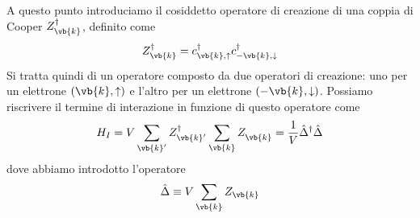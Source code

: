 A questo punto introduciamo il cosiddetto operatore di creazione di una coppia di Cooper $Z^{\dag}_{\vb{k}}$, definito come
\begin{equation*}
   Z^{\dag}_{\vb{k}}
   =c^{\dag}_{\vb{k},\uparrow} c^{\dag}_{-\vb{k},\downarrow}
\end{equation*}
Si tratta quindi di un operatore composto da due operatori di creazione: uno per un elettrone $(\vb{k},\uparrow)$ e l'altro per un elettrone $(-\vb{k},\downarrow)$. Possiamo riscrivere il termine di interazione in funzione di questo operatore come
\begin{equation*}
   H_I
   = V \sum_{\vb{k}'} Z^{\dag}_{\vb{k}'} \sum_{\vb{k}} Z^{\vphantom{\dag}}_{\vb{k}}
   =\frac{1}{V} \hat{\Delta}^{\dag} \hat{\Delta}
\end{equation*}
dove abbiamo introdotto l'operatore
\begin{equation*}
   \hat{\Delta} \equiv V \sum_{\vb{k}} Z_{\vb{k}}
\end{equation*}
